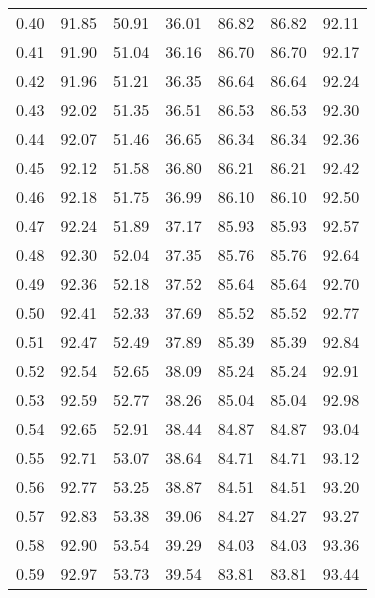 \begin{tabular}{|c|c|c|c|c|c|c|}
      0.40 &     91.85 &     50.91 &      36.01 &   86.82 &      86.82 &         92.11 \\
      0.41 &     91.90 &     51.04 &      36.16 &   86.70 &      86.70 &         92.17 \\
      0.42 &     91.96 &     51.21 &      36.35 &   86.64 &      86.64 &         92.24 \\
      0.43 &     92.02 &     51.35 &      36.51 &   86.53 &      86.53 &         92.30 \\
      0.44 &     92.07 &     51.46 &      36.65 &   86.34 &      86.34 &         92.36 \\
      0.45 &     92.12 &     51.58 &      36.80 &   86.21 &      86.21 &         92.42 \\
      0.46 &     92.18 &     51.75 &      36.99 &   86.10 &      86.10 &         92.50 \\
      0.47 &     92.24 &     51.89 &      37.17 &   85.93 &      85.93 &         92.57 \\
      0.48 &     92.30 &     52.04 &      37.35 &   85.76 &      85.76 &         92.64 \\
      0.49 &     92.36 &     52.18 &      37.52 &   85.64 &      85.64 &         92.70 \\
      0.50 &     92.41 &     52.33 &      37.69 &   85.52 &      85.52 &         92.77 \\
      0.51 &     92.47 &     52.49 &      37.89 &   85.39 &      85.39 &         92.84 \\
      0.52 &     92.54 &     52.65 &      38.09 &   85.24 &      85.24 &         92.91 \\
      0.53 &     92.59 &     52.77 &      38.26 &   85.04 &      85.04 &         92.98 \\
      0.54 &     92.65 &     52.91 &      38.44 &   84.87 &      84.87 &         93.04 \\
      0.55 &     92.71 &     53.07 &      38.64 &   84.71 &      84.71 &         93.12 \\
      0.56 &     92.77 &     53.25 &      38.87 &   84.51 &      84.51 &         93.20 \\
      0.57 &     92.83 &     53.38 &      39.06 &   84.27 &      84.27 &         93.27 \\
      0.58 &     92.90 &     53.54 &      39.29 &   84.03 &      84.03 &         93.36 \\
      0.59 &     92.97 &     53.73 &      39.54 &   83.81 &      83.81 &         93.44 \\

\end{tabular}
